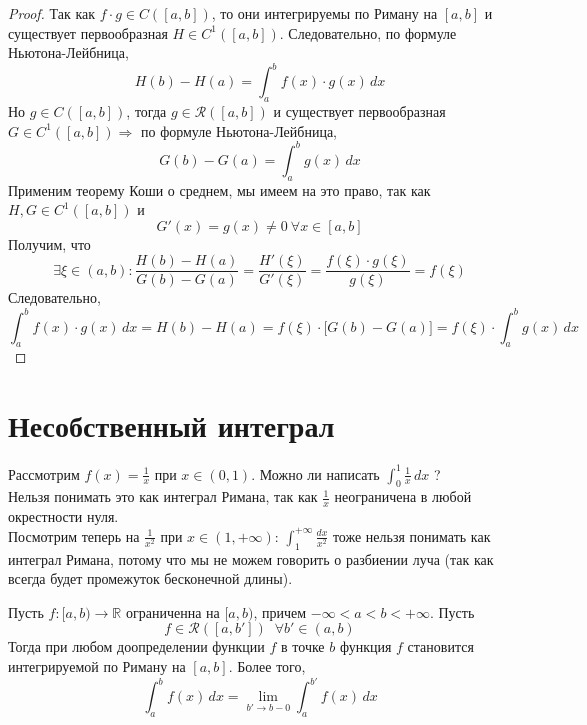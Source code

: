 \documentclass[11pt]{article}
\begin{document}
\begin{proof}
    Так как $f \cdot g \in C([a, b])$, то они интегрируемы по Риману на $[a, b]$ и существует
    первообразная $H \in C^1([a, b])$. Следовательно, по формуле Ньютона-Лейбница,
    \[H(b) - H(a) = \int_{a}^{b} f(x) \cdot g(x)\,dx\]
    Но $g \in C([a, b])$, тогда $g \in \mathcal{R}([a, b])$ и существует первообразная
    $G \in C^1([a, b]) \Longrightarrow$ по формуле Ньютона-Лейбница, 
    \[G(b) - G(a) = \int_{a}^{b} g(x)\,dx\] Применим теорему Коши о среднем, мы имеем
    на это право, так как $H, G \in C^1([a, b])$ и \[G'(x) = g(x) \neq 0 \ \forall
    x \in [a, b]\] Получим, что \[\exists \xi \in (a, b): \frac{H(b) - H(a)}{G(b) - G(a)}
    = \frac{H'(\xi)}{G'(\xi)} = \frac{f(\xi) \cdot g(\xi)}{g(\xi)} = f(\xi)\]
    Следовательно, \[\int_{a}^{b} f(x) \cdot g(x)\,dx =H(b) - H(a) = f(\xi) \cdot 
    \bigg[ G(b) - G(a)\bigg] = f(\xi) \cdot \int_{a}^{b} g(x)\,dx\]
\end{proof}

\section{Несобственный интеграл}

\begin{example}
    Рассмотрим $f(x) = \displaystyle \frac{1}{x}$ при $x \in (0, 1)$. Можно ли 
    написать $\displaystyle \int_{0}^{1} \frac{1}{x}\,dx$ ? \\ Нельзя понимать это 
    как интеграл Римана, так как $\displaystyle \frac{1}{x}$ неограничена в любой
    окрестности нуля. \\ Посмотрим теперь на $\displaystyle \frac{1}{x^2}$ при 
    $x \in (1, +\infty)$: $\displaystyle \int_{1}^{+\infty} \frac{dx}{x^2}$
    тоже нельзя понимать как интеграл Римана, потому что мы не можем говорить о 
    разбиении луча (так как всегда будет промежуток бесконечной длины).
\end{example}

\begin{theorem}
    Пусть $f \colon [a, b) \to \mathbb{R}$ ограниченна на $[a, b)$, причем $-\infty < a < b < + \infty$. Пусть 
    \[f \in \mathcal{R}([a, b']) \; \; \forall b' \in (a, b)\]
    Тогда при любом доопределении
    функции $f$ в точке $b$ функция $f$ становится интегрируемой по Риману на $[a, b]$. 
    Более того, \[\int_{a}^{b} f(x)\,dx = \lim_{b' \to b - 0} \int_{a}^{b'} f(x)\,dx \label{eq:star2} \tag{$\ast \ast$}\]
\end{theorem}
\end{document}
